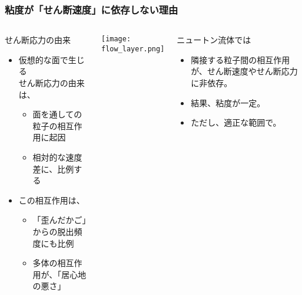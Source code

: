 \documentclass[12pt, dvipdfmx]{beamer}
\begin{document}
\begin{frame}
	\frametitle{粘度が「せん断速度」に依存しない理由}
		\vspace{-3mm}
		\begin{columns}[T, onlytextwidth]
				\begin{block}{せん断応力の由来}
					\begin{itemize}
						\item 仮想的な面で生じる\\せん断応力の由来は、
						\begin{itemize}
							\item \alert{面を通しての粒子の相互作用}に起因
							\item 相対的な速度差に、比例する
						\end{itemize}
						\item この相互作用は、
						\begin{itemize}
							\item 「歪んだかご」からの脱出頻度にも比例
							\item 多体の相互作用が、「居心地の悪さ」
						\end{itemize}
					\end{itemize}
				\end{block}
				\vspace{3mm}
				\texttt{[image: flow\_layer.png]}
				\begin{exampleblock}{ニュートン流体では}
					\begin{itemize}
						\item 隣接する粒子間の相互作用が、\alert{せん断速度やせん断応力に非依存。}
						\item 結果、粘度が一定。
						\item ただし、\alert{適正な範囲で。}
					\end{itemize}
				\end{exampleblock}
		\end{columns}
\end{frame}
\end{document}
